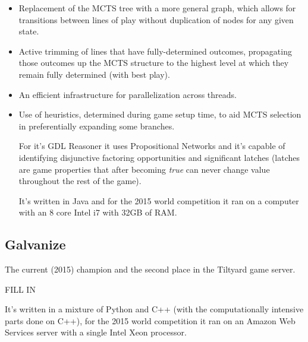 \begin{itemize}

\item Replacement of the MCTS tree with a more general graph, which allows for transitions between lines of play without duplication of nodes for any given state.

\item Active trimming of lines that have fully-determined outcomes, propagating those outcomes up the MCTS structure to the highest level at which they remain fully determined (with best play).

\item An efficient infrastructure for parallelization across threads.

\item Use of heuristics, determined during game setup time, to aid MCTS selection in preferentially expanding some branches.

For it's \gls{GDL} Reasoner it uses Propositional Networks and it's capable of identifying disjunctive factoring opportunities and significant latches (latches are game properties that after becoming \textit{true} can never change value throughout the rest of the game).

It's written in Java and for the 2015 world competition it ran on a computer with an 8 core Intel i7 with 32GB of RAM.

\end{itemize}


\subsection{Galvanize}
The current (2015) champion and the second place in the Tiltyard game server.

FILL IN

It's written in a mixture of Python and C++ (with the computationally intensive parts done on C++), for the 2015 world competition it ran on an Amazon Web Services server with a single Intel Xeon processor.